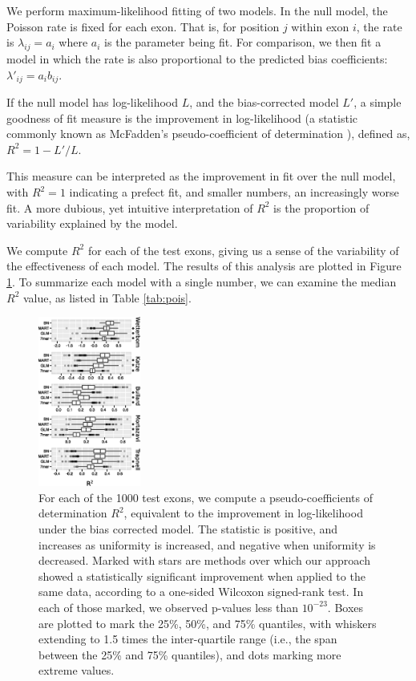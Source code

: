 \documentclass{bioinfo}
\begin{document}
We perform maximum-likelihood fitting of two models. In the null model, the
Poisson rate is fixed for each exon. That is, for position $j$ within exon $i$,
the rate is $ \lambda_{ij} = a_i $ where $a_i$ is the parameter being fit. For
comparison, we then fit a model in which the rate is also proportional to the
predicted bias coefficients: $ \lambda'_{ij} = a_i b_{ij} $.

If the null model has log-likelihood $L$, and the bias-corrected model $L'$, a
simple goodness of fit measure is the improvement in log-likelihood (a statistic
commonly known as McFadden's pseudo-coefficient of determination
\citep{McFadden1974}), defined as,
$R^2 = 1 - L'/L$.

This measure can be interpreted as the improvement in fit over the null model,
with $R^2 = 1$ indicating a prefect fit, and smaller numbers, an increasingly
worse fit. A more dubious, yet intuitive interpretation of $R^2$ is the
proportion of variability explained by the model.

We compute $R^2$ for each of the test exons, giving us a sense of the variability
of the effectiveness of each model. The results of this analysis are plotted in
Figure \ref{fig:pois}.  To summarize each model with a single number, we can
examine the median $R^2$ value, as listed in Table \ref{tab:pois}.

\begin{figure}
\centerline{\includegraphics[width=0.30\textwidth]{pois-boxplot.eps}}
\caption{For each of the 1000 test exons, we compute a pseudo-coefficients of
determination $R^2$, equivalent to the improvement in log-likelihood under the
bias corrected model. The statistic is positive, and increases as uniformity is
increased, and negative when uniformity is decreased.  Marked with stars are
methods over which our approach showed a statistically significant improvement
when applied to the same data, according to a one-sided Wilcoxon signed-rank
test. In each of those marked, we observed p-values less than $10^{-23}$.  Boxes
are plotted to mark the 25\%, 50\%, and 75\% quantiles, with whiskers extending
to 1.5 times the inter-quartile range (i.e., the span between the 25\% and 75\%
quantiles), and dots marking more extreme values.
}


    \label{fig:pois}
\end{figure}
\end{document}
